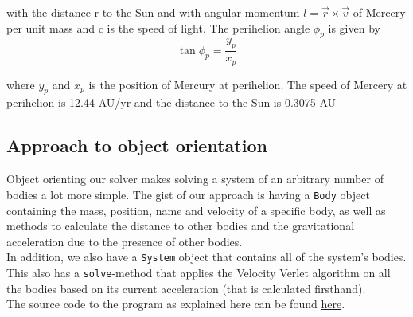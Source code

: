 \documentclass[../main.tex]{subfiles}
\begin{document}
 with the distance r to the Sun and with angular momentum $l = \vec r \times \vec v$ of Mercery per unit mass and c is the speed of light. The perihelion angle $\phi_p$ is given by
$$\tan \phi_p = \frac{y_p}{x_p}$$

where $y_p$ and $x_p$ is the position of Mercury at perihelion. The speed of Mercery at perihelion is 12.44 AU/yr and the distance to the Sun is 0.3075 AU

\subsection{Approach to object orientation}
Object orienting our solver makes solving a system of an arbitrary number of bodies a lot more simple. The gist of our approach is having a \verb+Body+ object containing the mass, position, name and velocity of a specific body, as well as methods to calculate the distance to other bodies and the gravitational acceleration due to the presence of other bodies. \\
In addition, we also have a \verb+System+ object that contains all of the system's bodies. This also has a \verb+solve+-method that applies the Velocity Verlet algorithm on all the bodies based on its current acceleration (that is calculated firsthand). \\
The source code to the program as explained here can be found \href{https://github.com/kmaasrud/Project-5/tree/master/code/complete_solar-system}{here}.
\end{document}
